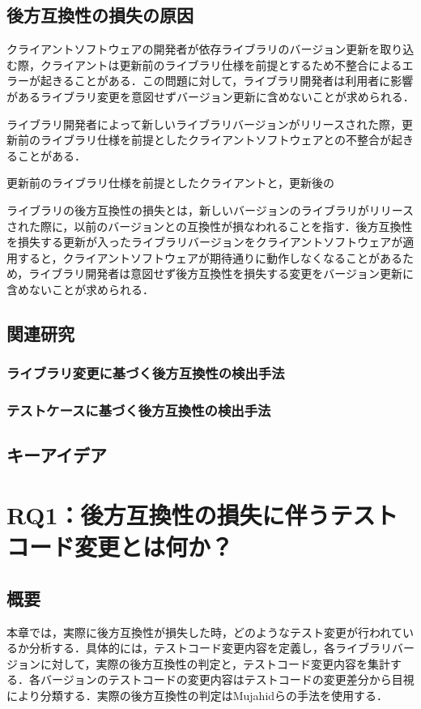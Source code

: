 \documentclass[11pt,dvipdfmx]{jreport}
\begin{document}
\section{後方互換性の損失の原因}
クライアントソフトウェアの開発者が依存ライブラリのバージョン更新を取り込む際，クライアントは更新前のライブラリ仕様を前提とするため不整合によるエラーが起きることがある．この問題に対して，ライブラリ開発者は利用者に影響があるライブラリ変更を意図せずバージョン更新に含めないことが求められる．

ライブラリ開発者によって新しいライブラリバージョンがリリースされた際，更新前のライブラリ仕様を前提としたクライアントソフトウェアとの不整合が起きることがある．

更新前のライブラリ仕様を前提としたクライアントと，更新後の


ライブラリの後方互換性の損失とは，新しいバージョンのライブラリがリリースされた際に，以前のバージョンとの互換性が損なわれることを指す．後方互換性を損失する更新が入ったライブラリバージョンをクライアントソフトウェアが適用すると，クライアントソフトウェアが期待通りに動作しなくなることがあるため，ライブラリ開発者は意図せず後方互換性を損失する変更をバージョン更新に含めないことが求められる．

\section{関連研究}

\subsection{ライブラリ変更に基づく後方互換性の検出手法}

\subsection{テストケースに基づく後方互換性の検出手法}

\section{キーアイデア}

\chapter{RQ1：後方互換性の損失に伴うテストコード変更とは何か？}\label{rq1}

\section{概要}
本章では，実際に後方互換性が損失した時，どのようなテスト変更が行われているか分析する．具体的には，テストコード変更内容を定義し，各ライブラリバージョンに対して，実際の後方互換性の判定と，テストコード変更内容を集計する．各バージョンのテストコードの変更内容はテストコードの変更差分から目視により分類する．実際の後方互換性の判定はMujahidらの手法を使用する．
\end{document}
